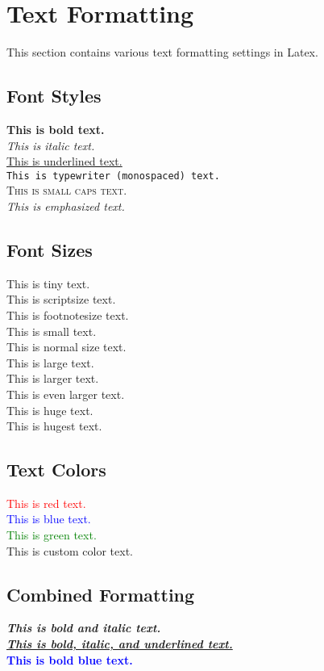 \section{Text Formatting}

This section contains various text formatting settings in Latex.

\subsection{Font Styles}

\textbf{This is bold text.}\\
\textit{This is italic text.}\\
\underline{This is underlined text.}\\
\texttt{This is typewriter (monospaced) text.}\\
\textsc{This is small caps text.}\\
\emph{This is emphasized text.}

\subsection{Font Sizes}

\tiny{This is tiny text.}\\
\scriptsize{This is scriptsize text.}\\
\footnotesize{This is footnotesize text.}\\
\small{This is small text.}\\
\normalsize{This is normal size text.}\\
\large{This is large text.}\\
\Large{This is larger text.}\\
\LARGE{This is even larger text.}\\
\huge{This is huge text.}\\
\Huge{This is hugest text.}

\subsection{Text Colors}

\textcolor{red}{This is red text.}\\
\textcolor{blue}{This is blue text.}\\
\textcolor{green}{This is green text.}\\
\textcolor{codehighlight}{This is custom color text.}

\subsection{Combined Formatting}

\textbf{\textit{This is bold and italic text.}}\\
\underline{\textbf{\textit{This is bold, italic, and underlined text.}}}\\
\textcolor{blue}{\textbf{This is bold blue text.}}